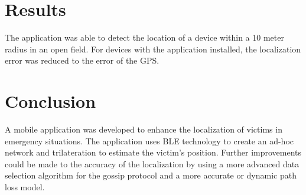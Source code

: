 \documentclass{article}
\begin{document}
\begin{multicols}{2}
\section{Results}
The application was able to detect the location of
a device within a 10 meter radius in an open field.
For devices with the application installed, the
localization error was reduced to the error of the
GPS.
\section{Conclusion}
A mobile application was developed to enhance the
localization of victims in emergency situations.
The application uses BLE technology to create an
ad-hoc network and trilateration to estimate the
victim's position.
Further improvements could be made to the
accuracy of the localization by using a more
advanced data selection algorithm for the 
gossip protocol and a more accurate or dynamic
path loss model.
\end{multicols}


\end{document}
